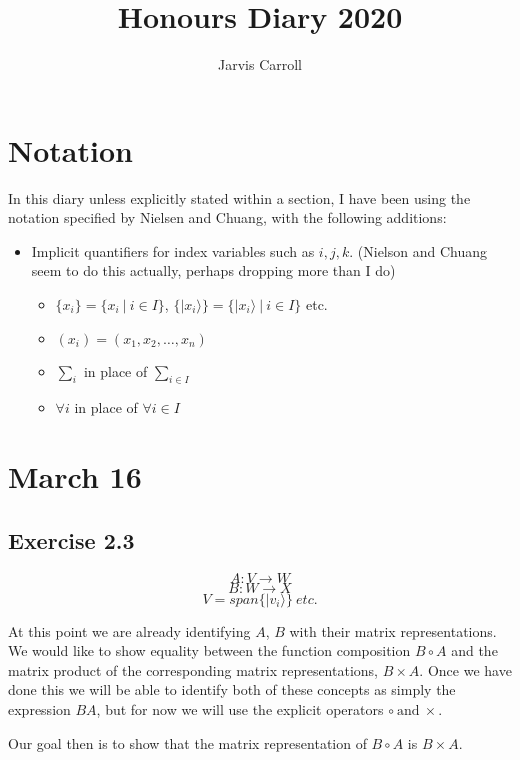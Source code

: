 \documentclass[]{article}
\title{Honours Diary 2020}
\author{Jarvis Carroll}
\begin{document}
\maketitle

\section{Notation}

In this diary unless explicitly stated within a section, I have been using the notation specified by Nielsen and Chuang, with the following additions:
\begin{itemize}
	\item Implicit quantifiers for index variables such as $i, j, k$. (Nielson and Chuang seem to do this actually, perhaps dropping more than I do)
	\begin{itemize}
		\item $\{x_i\} = \{x_i\ |\ i \in I\}$, $\{|x_i\rangle\} = \{|x_i\rangle\ |\ i \in I\}$ etc.
		\item $(x_i) = (x_1, x_2, \ldots, x_n)$
		\item $\sum_i$ in place of $\sum_{i \in I}$
		\item $\forall i$ in place of $\forall i \in I$
	\end{itemize}
\end{itemize}

\section{March 16}

\subsection{Exercise 2.3}
\[
A: V \to W
\]\[
B: W \to X
\]\[
V = span\{|v_i\rangle\}\ \textit{etc.}
\]

At this point we are already identifying $A$, $B$ with their matrix representations. We would like to show equality between the function composition $B \circ A$ and the matrix product of the corresponding matrix representations, $B \times A$.
Once we have done this we will be able to identify both of these concepts as simply the expression $BA$, but for now we will use the explicit operators
$\circ\ \text{and}\ \times$.

Our goal then is to show that the matrix representation of $B \circ A$ is $B \times A$.
\end{document}
